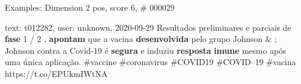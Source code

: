 \begin{frame}{Examples: Dimension 2 pos, score 6, \# 000029}
\footnotesize
\begin{exampleblock}{text: t012282, user: unknown, 2020-09-29}
 Resultados preliminares e parciais de \textbf{fase} 1 / 2 , 
\textbf{apontam} que a vacina \textbf{desenvolvida} pelo grupo Johnson \& ; 
Johnson contra a Covid-19 é \textbf{segura} e induziu \textbf{resposta} 
\textbf{imune} mesmo após uma única aplicação. \#vaccine \#coronavirus 
\#COVID19 \#COVID--19 \#vacina https://t.co/EPUkmIWtNA 
\end{exampleblock}
\end{frame}
